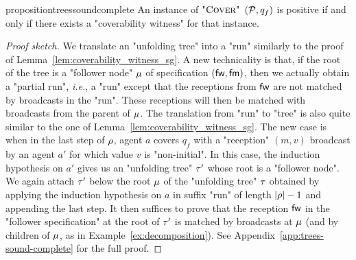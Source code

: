 \begin{restatable}{proposition}{treessoundcomplete}
	\label{prop:trees-sound-complete}
	An instance of $\textsc{"Cover"}$ $(\mathcal{P},q_f)$ is positive if and only if there exists a "coverability witness" for that instance.
\end{restatable}
\begin{proof}[Proof sketch]
	We translate an "unfolding tree" into a "run" similarly to the proof of Lemma~\ref{lem:coverability_witness_sg}. A new technicality is that, if the root of the tree is a "follower node" $\mu$ of specification $(\mathsf{fw}, \mathsf{fm})$, then we actually obtain a "partial run", \emph{i.e.}, a "run" except that the receptions from $\mathsf{fw}$ are not matched by broadcasts in the "run". These receptions will then be matched with broadcasts from the parent of $\mu$.
	The translation from "run" to "tree" is also quite similar to the one of Lemma~\ref{lem:coverability_witness_sg}. The new case is when in the last step of $\rho$, agent $a$ covers $q_f$ with a "reception" $(m,v)$ broadcast by an agent $a'$ for which value $v$ is "non-initial". In this case, the induction hypothesis on $a'$ gives us an "unfolding tree" $\tau'$ whose root is a "follower node". We again attach $\tau'$ below the root $\mu$ of the "unfolding tree" $\tau$ obtained by applying the induction hypothesis on $a$ in suffix "run" of length $|\rho|-1$ and appending the last step. It then suffices to prove that the reception $\mathsf{fw}$ in the "follower specification" at the root of $\tau'$ is matched by broadcasts at $\mu$ (and by children of $\mu$, as in Example~\ref{ex:decomposition}). See Appendix~\ref{app:trees-sound-complete} for the full proof. %

\end{proof}
